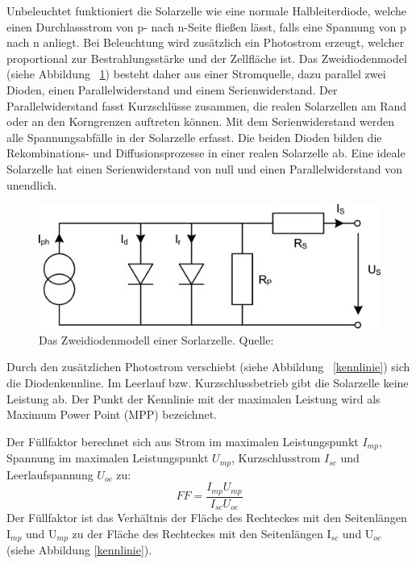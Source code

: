 \documentclass[a4paper,bibtotoc,oneside]{scrbook}
\begin{document}
Unbeleuchtet funktioniert die Solarzelle wie eine normale Halbleiterdiode, welche einen Durchlassstrom von p- nach n-Seite fließen lässt, falls eine Spannung von p nach n anliegt. Bei Beleuchtung wird zusätzlich ein Photostrom erzeugt, welcher proportional zur Bestrahlungsstärke und der Zellfläche ist. Das Zweidiodenmodel (siehe Abbildung ~\ref{esb}) besteht daher aus einer Stromquelle, dazu parallel zwei Dioden, einen Parallelwiderstand und einem Serienwiderstand. Der Parallelwiderstand fasst Kurzschlüsse zusammen, die realen Solarzellen am Rand oder an den Korngrenzen auftreten können. Mit dem Serienwiderstand werden alle Spannungsabfälle in der Solarzelle erfasst. Die beiden Dioden bilden die Rekombinations- und Diffusionsprozesse in einer realen Solarzelle ab. Eine ideale Solarzelle hat einen Serienwiderstand von null und einen Parallelwiderstand von unendlich. 
\begin{figure}[htbp]
\centering
\includegraphics[width=125mm]{img/esb2.png}
\caption{Das Zweidiodenmodell einer Sorlarzelle. Quelle: \cite{pv}}\label{esb}
\end{figure}

Durch den zusätzlichen Photostrom verschiebt (siehe Abbildung ~\ref{kennlinie}) sich die Diodenkennline. Im Leerlauf  bzw. Kurzschlussbetrieb gibt die Solarzelle keine Leistung ab. Der Punkt der Kennlinie mit der maximalen Leistung wird als Maximum Power Point (MPP) bezeichnet.

Der Füllfaktor berechnet sich aus Strom im maximalen Leistungspunkt $I_{mp}$, Spannung im maximalen Leistungspunkt $U_{mp}$, Kurzschlusstrom $I_{sc}$ und Leerlaufspannung $U_{oc}$ zu:
  \begin{equation}
     FF = \frac {I_{mp} U_{mp}} {I_{sc} U_{oc}}
  \end{equation}
Der Füllfaktor ist das Verhältnis der Fläche des Rechteckes mit den Seitenlängen I$_{mp}$ und U$_{mp}$ zu der Fläche des Rechteckes mit den Seitenlängen I$_{sc}$ und U$_{oc}$ (siehe Abbildung \ref{kennlinie}).
\end{document}
